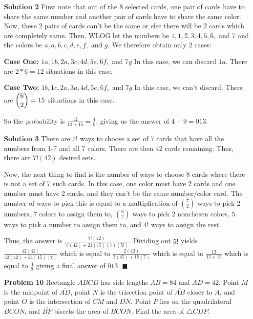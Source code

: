 \documentclass[a4paper,11pt]{article}
\begin{document}
\textbf{Solution 2}
First note that out of the $8$ selected cards, one pair of cards have to share the same number and another pair of cards have to share the same color. Now, these $2$ pairs of cards can't be the same or else there will be $2$ cards which are completely same. Then, WLOG let the numbers be $1,1,2,3,4,5,6,$ and $7$ and the colors be $a,a,b,c,d,e,f,$ and $g$. We therefore obtain only $2$ cases:

\textbf{Case One:} $1a,1b,2a,3c,4d,5e,6f,$ and $7g$ In this case, we can discard $1a$. There are $2*6=12$ situations in this case.

\textbf{Case Two:} $1b,1c,2a,3a,4d,5e,6f,$ and $7g$ In this case, we can't discard. There are $\dbinom{6}{2}=15$ situations in this case.

So the probability is $\frac{12}{12+15}=\frac{4}{9}$, giving us the answer of $4+9=\boxed{013}$.

\textbf{Solution 3}
There are $7!$ ways to choose a set of 7 cards that have all the numbers from 1-7 and all 7 colors. There are then $42$ cards remaining. Thus, there are $7!(42)$ desired sets.

Now, the next thing to find is the number of ways to choose 8 cards where there is not a set of 7 such cards. In this case, one color must have 2 cards and one number must have 2 cards, and they can't be the same number/color card. The number of ways to pick this is equal to a multiplication of $\binom{7}{2}$ ways to pick 2 numbers, $7$ colors to assign them to, $\binom{6}{2}$ ways to pick 2 nonchosen colors, $5$ ways to pick a number to assign them to, and $4!$ ways to assign the rest.

Thus, the answer is $\frac{7!(42)}{7!(42) + 21(15)(7)(5!)}$. Dividing out $5!$ yields $\frac{42(42)}{42(42) + 21(15)(7)}$ which is equal to $\frac{2(42)}{2(42) + 15(7)}$ which is equal to $\frac{12}{12 + 15}$ which is equal to $\frac{4}{9}$ giving a final answer of $\boxed{013}$. \hfill $\blacksquare$

\textbf{Problem 10}
Rectangle $ABCD$ has side lengths $AB=84$ and $AD=42$. Point $M$ is the midpoint of $\overline{AD}$, point $N$ is the trisection point of $\overline{AB}$ closer to $A$, and point $O$ is the intersection of $\overline{CM}$ and $\overline{DN}$. Point $P$ lies on the quadrilateral $BCON$, and $\overline{BP}$ bisects the area of $BCON$. Find the area of $\triangle CDP$.
\end{document}

